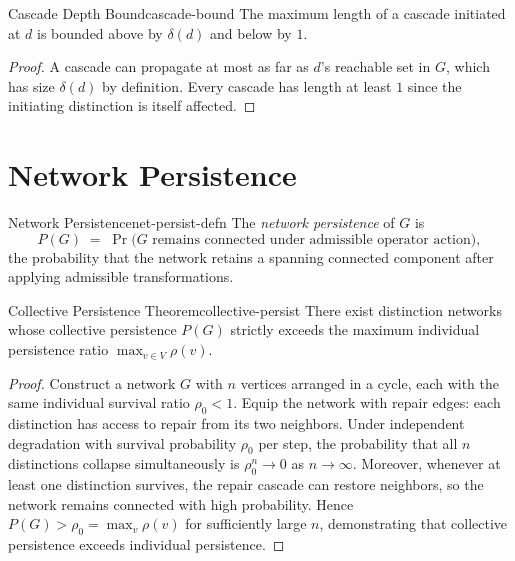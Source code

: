\documentclass[12pt,twoside,openright]{book}
\newcommand{\survRatio}{\rho}             %
\providecommand{\distNet}{G}
\providecommand{\distNetV}{V}
\providecommand{\depDepth}[1]{\delta(#1)}
\providecommand{\netPersist}[1]{P(#1)}
\begin{document}
\begin{proposition}{Cascade Depth Bound}{cascade-bound}
The maximum length of a cascade initiated at $d$ is bounded
above by $\depDepth{d}$ and below by $1$.
\begin{proof}
A cascade can propagate at most as far as $d$'s reachable set
in $\distNet$, which has size $\depDepth{d}$ by definition.
Every cascade has length at least $1$ since the initiating
distinction is itself affected.
\end{proof}
\end{proposition}

\section{Network Persistence}

\begin{definition}{Network Persistence}{net-persist-defn}
The \emph{network persistence} of $\distNet$ is
\[
  \netPersist{\distNet}
  \;=\;
  \Pr\bigl(
    \distNet\text{ remains connected under admissible operator action}
  \bigr),
\]
the probability that the network retains a spanning connected
component after applying admissible transformations.
\end{definition}

\begin{theorem}{Collective Persistence Theorem}{collective-persist}
There exist distinction networks whose collective persistence
$\netPersist{\distNet}$ strictly exceeds the maximum individual
persistence ratio $\max_{v\in\distNetV}\survRatio(v)$.
\begin{proof}
Construct a network $\distNet$ with $n$ vertices arranged in
a cycle, each with the same individual survival ratio
$\survRatio_0<1$. Equip the network with repair edges: each
distinction has access to repair from its two neighbors. Under
independent degradation with survival probability $\survRatio_0$
per step, the probability that all $n$ distinctions collapse
simultaneously is $\survRatio_0^n\to 0$ as $n\to\infty$.
Moreover, whenever at least one distinction survives, the
repair cascade can restore neighbors, so the network remains
connected with high probability. Hence
$\netPersist{\distNet}>\survRatio_0=\max_v\survRatio(v)$
for sufficiently large $n$, demonstrating that collective
persistence exceeds individual persistence.
\end{proof}
\end{theorem}
\end{document}
